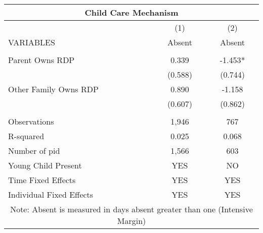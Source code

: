 \begin{tabular}{lcc}
\multicolumn{3}{c}{Child Care Mechanism} \\ \hline
 & (1) & (2) \\
VARIABLES & Absent & Absent \\ \hline
 &  &  \\
Parent Owns RDP & 0.339 & -1.453* \\
 & (0.588) & (0.744) \\
Other Family Owns RDP & 0.890 & -1.158 \\
 & (0.607) & (0.862) \\
 &  &  \\
Observations & 1,946 & 767 \\
R-squared & 0.025 & 0.068 \\
Number of pid & 1,566 & 603 \\
Young Child Present & YES & NO \\
Time Fixed Effects & YES & YES \\
 Individual Fixed Effects & YES & YES \\ \hline
\multicolumn{3}{c}{ Note: Absent is measured in days absent greater than one (Intensive Margin)} \\
\end{tabular}
